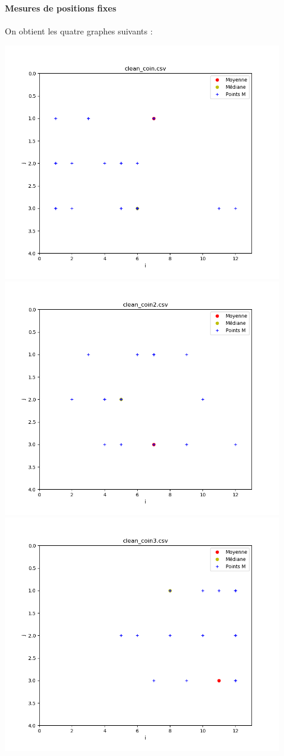 \documentclass[french, a4paper, 12pt, parskip]{scrartcl}
\begin{document}
\paragraph{Mesures de positions fixes}

On obtient les quatre graphes suivants :
\begin{center}
  \includegraphics[width=0.9\textwidth]{finger1-f1.png}
  \includegraphics[width=0.9\textwidth]{finger1-f2.png}
  \includegraphics[width=0.9\textwidth]{finger1-f3.png}

\end{center}
\end{document}
